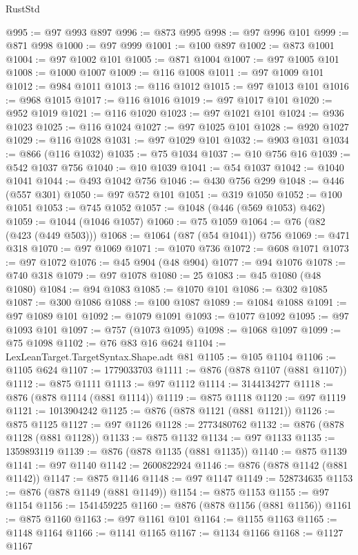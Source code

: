 \begin{lexlean}{RustStd}
\begin{coremodule}
@995 := @97 @993 @897
@996 := @873 @995
@998 := @97 @996 @101
@999 := @871 @998
@1000 := @97 @999
@1001 := @100 @897
@1002 := @873 @1001
@1004 := @97 @1002 @101
@1005 := @871 @1004
@1007 := @97 @1005 @101
@1008 := @1000 @1007
@1009 := @116 @1008
@1011 := @97 @1009 @101
@1012 := @984 @1011
@1013 := @116 @1012
@1015 := @97 @1013 @101
@1016 := @968 @1015
@1017 := @116 @1016
@1019 := @97 @1017 @101
@1020 := @952 @1019
@1021 := @116 @1020
@1023 := @97 @1021 @101
@1024 := @936 @1023
@1025 := @116 @1024
@1027 := @97 @1025 @101
@1028 := @920 @1027
@1029 := @116 @1028
@1031 := @97 @1029 @101
@1032 := @903 @1031
@1034 := @866 (@116 @1032)
@1035 := @75 @1034
@1037 := @10 @756 @16
@1039 := @542 @1037 @756
@1040 := @10 @1039
@1041 := @54 @1037
@1042 := @1040 @1041
@1044 := @493 @1042 @756
@1046 := @430 @756 @299
@1048 := @446 (@557 @301)
@1050 := @97 @572 @101
@1051 := @319 @1050
@1052 := @100 @1051
@1053 := @745 @1052
@1057 := @1048 (@446 (@569 @1053) @462)
@1059 := @1044 (@1046 @1057)
@1060 := @75 @1059
@1064 := @76 (@82 (@423 (@449 @503)))
@1068 := @1064 (@87 (@54 @1041)) @756
@1069 := @471 @318
@1070 := @97 @1069
@1071 := @1070 @736
@1072 := @608 @1071
@1073 := @97 @1072
@1076 := @45 @904 (@48 @904)
@1077 := @94 @1076
@1078 := @740 @318
@1079 := @97 @1078
@1080 := 25
@1083 := @45 @1080 (@48 @1080)
@1084 := @94 @1083
@1085 := @1070 @101
@1086 := @302 @1085
@1087 := @300 @1086
@1088 := @100 @1087
@1089 := @1084 @1088
@1091 := @97 @1089 @101
@1092 := @1079 @1091
@1093 := @1077 @1092
@1095 := @97 @1093 @101
@1097 := @757 (@1073 @1095)
@1098 := @1068 @1097
@1099 := @75 @1098
@1102 := @76 @83 @16 @624
@1104 := LexLeanTarget.TargetSyntax.Shape.adt @81
@1105 := @105 @1104
@1106 := @1105 @624
@1107 := 1779033703
@1111 := @876 (@878 @1107 (@881 @1107))
@1112 := @875 @1111
@1113 := @97 @1112
@1114 := 3144134277
@1118 := @876 (@878 @1114 (@881 @1114))
@1119 := @875 @1118
@1120 := @97 @1119
@1121 := 1013904242
@1125 := @876 (@878 @1121 (@881 @1121))
@1126 := @875 @1125
@1127 := @97 @1126
@1128 := 2773480762
@1132 := @876 (@878 @1128 (@881 @1128))
@1133 := @875 @1132
@1134 := @97 @1133
@1135 := 1359893119
@1139 := @876 (@878 @1135 (@881 @1135))
@1140 := @875 @1139
@1141 := @97 @1140
@1142 := 2600822924
@1146 := @876 (@878 @1142 (@881 @1142))
@1147 := @875 @1146
@1148 := @97 @1147
@1149 := 528734635
@1153 := @876 (@878 @1149 (@881 @1149))
@1154 := @875 @1153
@1155 := @97 @1154
@1156 := 1541459225
@1160 := @876 (@878 @1156 (@881 @1156))
@1161 := @875 @1160
@1163 := @97 @1161 @101
@1164 := @1155 @1163
@1165 := @1148 @1164
@1166 := @1141 @1165
@1167 := @1134 @1166
@1168 := @1127 @1167

\end{coremodule}
\end{lexlean}

